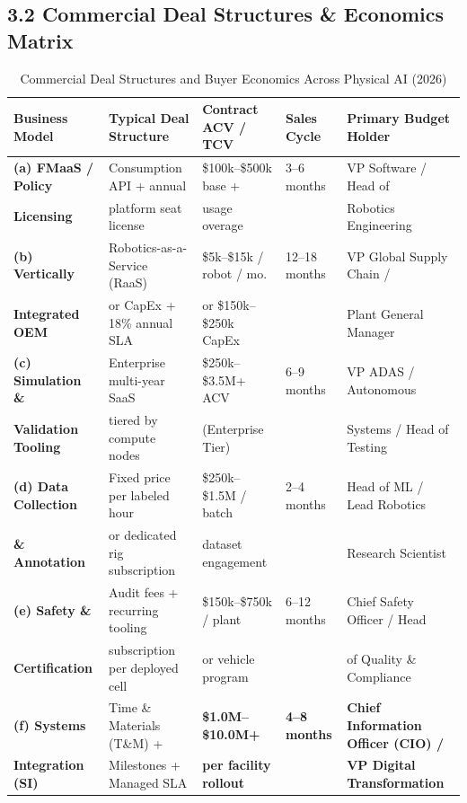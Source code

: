 \documentclass[11pt,a4paper]{article}
\begin{document}
\subsection{3.2 Commercial Deal Structures \& Economics Matrix}
\begin{table}[h!]
\centering
\scriptsize
\begin{tabularx}{\textwidth}{@{}l p{3.2cm} p{2.8cm} l p{3.5cm}@{}}
\toprule
\textbf{Business Model} & \textbf{Typical Deal Structure} & \textbf{Contract ACV / TCV} & \textbf{Sales Cycle} & \textbf{Primary Budget Holder} \\
\midrule
\textbf{(a) FMaaS / Policy} & Consumption API + annual & \$100k--\$500k base + & 3--6 months & VP Software / Head of \\
\textbf{Licensing} & platform seat license & usage overage & & Robotics Engineering \\
\addlinespace
\textbf{(b) Vertically} & Robotics-as-a-Service (RaaS) & \$5k--\$15k / robot / mo. & 12--18 months & VP Global Supply Chain / \\
\textbf{Integrated OEM} & or CapEx + 18\% annual SLA & or \$150k--\$250k CapEx & & Plant General Manager \\
\addlinespace
\textbf{(c) Simulation \&} & Enterprise multi-year SaaS & \$250k--\$3.5M+ ACV & 6--9 months & VP ADAS / Autonomous \\
\textbf{Validation Tooling} & tiered by compute nodes & (Enterprise Tier) & & Systems / Head of Testing \\
\addlinespace
\textbf{(d) Data Collection} & Fixed price per labeled hour & \$250k--\$1.5M / batch & 2--4 months & Head of ML / Lead Robotics \\
\textbf{\& Annotation} & or dedicated rig subscription & dataset engagement & & Research Scientist \\
\addlinespace
\textbf{(e) Safety \&} & Audit fees + recurring tooling & \$150k--\$750k / plant & 6--12 months & Chief Safety Officer / Head \\
\textbf{Certification} & subscription per deployed cell & or vehicle program & & of Quality \& Compliance \\
\addlinespace
\textbf{(f) Systems} & Time \& Materials (T\&M) + & \textbf{\$1.0M--\$10.0M+} & \textbf{4--8 months} & \textbf{Chief Information Officer (CIO) /} \\
\textbf{Integration (SI)} & Milestones + Managed SLA & \textbf{per facility rollout} & & \textbf{VP Digital Transformation} \\
\bottomrule
\end{tabularx}
\caption{Commercial Deal Structures and Buyer Economics Across Physical AI (2026)}
\end{table}
\end{document}
